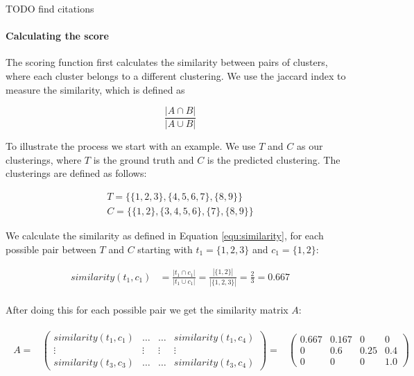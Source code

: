 TODO find citations

\paragraph{Calculating the score}

The scoring function first calculates the similarity between pairs of clusters, where each cluster belongs to a different clustering. We use the jaccard index to measure the similarity, which is defined as

\begin{equation}
    \label{equ:similarity}
    \frac{|A \cap B|}{|A \cup B|}
\end{equation}

To illustrate the process we start with an example. We use $T$ and $C$ as our clusterings, where $T$ is the ground truth and $C$ is the predicted clustering. The clusterings are defined as follows:

\begin{gather*}
    T = \{\{1,2,3\},\{4,5,6,7\},\{8,9\}\} \\
    C = \{\{1,2\},\{3,4,5,6\},\{7\},\{8,9\}\}
\end{gather*}

We calculate the similarity as defined in Equation \ref{equ:similarity}, for each possible pair between $T$ and $C$ starting with $t_1= \{1,2,3\}$ and $c_1 = \{1,2\}$:

\begin{align*}
    similarity(t_1,c_1) &=\frac{|t_1 \cap c_1|}{|t_1 \cup c_1|} 
    = \frac{|\{1,2\}|}{|\{1,2,3\}|} 
    = \frac{2}{3} = 0.667 \\
\end{align*}

After doing this for each possible pair we get the similarity matrix $A$:

\begin{gather*}
\begin{array}{rcl}
    A = & \left(\begin{array}{cccc}
        similarity(t_1,c_1) & \hdots & \hdots & similarity(t_1,c_4)\\
        \vdots & \vdots & \vdots & \vdots\\
        similarity(t_3,c_3) & \hdots & \hdots & similarity(t_3,c_4) \end{array}\right)
        = & \left(\begin{array}{cccc}
            0.667 & 0.167 & 0 & 0 \\
            0 & 0.6 & 0.25 & 0.4 \\
            0 &  0 & 0 & 1.0 \end{array}\right)
\end{array}
\end{gather*}

